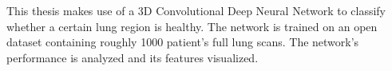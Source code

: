 \documentclass[main.tex]{subfiles}
\begin{document}
This thesis makes use of a 3D Convolutional Deep Neural Network to classify whether a certain lung region is healthy. The network is trained on an open dataset containing roughly 1000 patient's full lung scans. The network's performance is analyzed and its features visualized.
\end{document}
